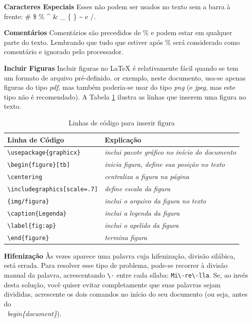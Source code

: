 \begin{anexosenv}
\textbf{Caracteres Especiais} Esses não podem ser usados no texto sem a barra à frente: \# \$ \% \^{ } \& \_ \{ \} \~{ } e \slash .

\textbf{Comentários} Comentários são precedidos de \% e podem estar em qualquer parte do texto.
  Lembrando que tudo que estiver após \% será considerado como comentário e ignorado pelo processador.

\textbf{Incluir Figuras} Incluir figuras no LaTeX é relativamente fácil quando se tem um formato de arquivo pré-definido.
  or exemplo, neste documento, usa-se apenas figuras do tipo \textit{pdf}, mas também poderia-se usar do tipo \textit{png} (e \textit{jpeg}, mas este tipo não é recomendado).
  A Tabela \ref{tab:codfig} ilustra as linhas que inserem uma figura no texto. 

\begin{table}[ht]
  \caption{Linhas de código para inserir figura}
	\centering
	\footnotesize	
		\begin{tabular}{l l}
	\\	\hline 
Linha de Código & Explicação \\ \hline 
\verb|\usepackage{graphicx}| & \textit{inclui pacote gráfico no início do documento} \\
\verb|\begin{figure}[tb]|    & \textit{inicia figura, define sua posição no texto} \\
\verb|\centering|            & \textit{centraliza a figura na página}\\
\verb|\includegraphics[scale=.7]|& \textit{define escala da figura}\\
\verb|{img/figura}|      & \textit{inclui o arquivo da figura no texto}\\
\verb|\caption{Legenda}|     & \textit{inclui a legenda da figura}\\
\verb|\label{fig:ap}|        & \textit{inclui o apelido da figura}\\
\verb|\end{figure}|          & \textit{termina figura}\\
		\hline\end{tabular}
	\label{tab:codfig}
\end{table}

\textbf{Hifenização} Às vezes aparece uma palavra cuja hifenização, divisão silábica, está errada. Para resolver esse tipo de problema, pode-se recorrer à divisão manual da palavra, acrescentando \verb|\-| entre cada sílaba: \verb|Mi\-re\-lla|. Se, ao invés desta solução, você quiser evitar completamente que suas palavras sejam divididas, acrescente os dois comandos no início do seu documento (ou seja, antes do \\~\textit{begin\{document\}}).


\end{anexosenv}
